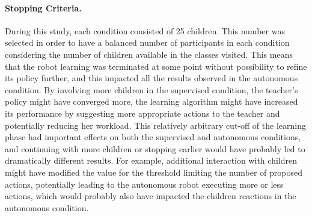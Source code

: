 
\paragraph{Stopping Criteria.}

During this study, each condition consisted of 25 children. This number was selected in order to have a balanced number of participants in each condition considering the number of  children available in the classes visited. This means that the robot learning was terminated at some point without possibility to refine its policy further, and this impacted all the results observed in the autonomous condition. By involving more children in the supervised condition, the teacher's policy might have converged more, the learning algorithm might have increased its performance by suggesting more appropriate actions to the teacher and potentially reducing her workload. This relatively arbitrary cut-off of the learning phase had important effects on both the supervised and autonomous conditions, and continuing with more children or stopping earlier would have probably led to dramatically different results. For example, additional interaction with children might have modified the value for the threshold limiting the number of proposed actions, potentially leading to the autonomous robot executing more or less actions, which would probably also have impacted the children reactions in the autonomous condition.

